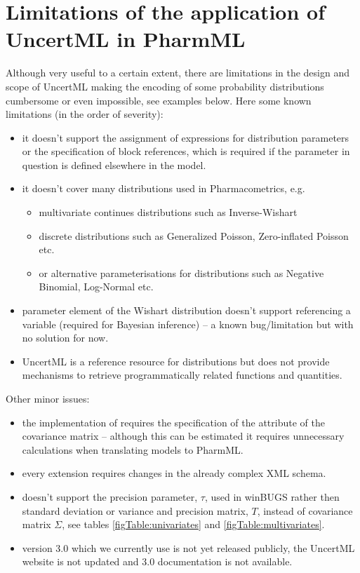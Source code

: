 \section{Limitations of the application of UncertML in PharmML}
\label{sec:uncertmlLimits}
Although very useful to a certain extent, there are limitations in
the design and scope of UncertML making the encoding of some 
probability distributions cumbersome or even impossible, see examples below. 
Here some known limitations (in the order of severity):
\begin{itemize}
\item
it doesn't support the assignment of expressions for distribution parameters or 
the specification of block references, which is required if the parameter in question 
is defined elsewhere in the model. 
\item
it doesn't cover many distributions used in Pharmacometrics, e.g. 
\begin{itemize}
\item 
multivariate continues distributions such as Inverse-Wishart
\item
discrete distributions such as Generalized Poisson, Zero-inflated Poisson etc.
\item
or alternative parameterisations for distributions such as Negative Binomial, 
Log-Normal etc.
\end{itemize}
\item
{} parameter element of the Wishart distribution doesn't support
referencing a variable (required for Bayesian inference) -- a known bug/limitation 
but with no solution for now.
\item
UncertML is a reference resource for distributions but does not provide 
mechanisms to retrieve programmatically related functions and
quantities.  
\end{itemize}
Other minor issues:
\begin{itemize}
\item
the implementation of  requires the specification 
of the  attribute of the covariance matrix -- although this can be estimated
it requires unnecessary calculations when translating models to PharmML. 
\item
every extension requires changes in the already complex XML schema.
\item
doesn't support the precision parameter, $\tau$, used in winBUGS  
rather then standard deviation or variance and precision matrix, $T$, instead 
of covariance matrix $\Sigma$, see tables \ref{figTable:univariates} and \ref{figTable:multivariates}.
\item
version 3.0 which we currently use is not yet released publicly, the UncertML website 
is not updated and 3.0 documentation is not available.
\end{itemize}

